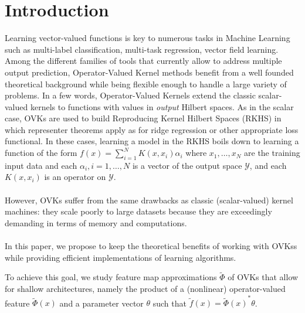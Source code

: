 \documentclass[twoside,11pt]{article}
\begin{document}

\section{Introduction}
Learning vector-valued functions is key to numerous tasks in Machine Learning such as multi-label classification, multi-task regression, vector field learning. 
Among the different families of tools that currently allow to address multiple output prediction, Operator-Valued Kernel methods \citep{Micchelli2005,Carmeli2010,Kadri_aistat10,
Brouard2011,Alvarez2012} benefit from a well founded theoretical background while being flexible enough to handle a large variety of problems. In a few words, Operator-Valued Kernels extend the classic scalar-valued kernels to functions
with values in \emph{output} Hilbert spaces. As in the scalar case,
\acfp{OVK} are used to build Reproducing Kernel Hilbert Spaces (\acs{RKHS}) in
which representer theorems apply as for ridge regression or other appropriate
loss functional. In these cases, learning a model in the \acs{RKHS} boils down
to learning a function of the form $f(x)=\sum_{i=1}^N K(x,x_i)\alpha_i$ where
$x_1, \ldots, x_N$ are the training input data and each $\alpha_i, i=1, \ldots,
N$ is a vector of the output space $\mathcal{Y}$, and each $K(x,x_i)$ is an
operator on $\mathcal{Y}$.
\paragraph{}
However, \acsp{OVK} suffer from the same drawbacks as classic
(sca\-lar-va\-lued) kernel machines: they scale poorly to large datasets
because they are exceedingly demanding in terms of memory and computations. 




\paragraph{}
In this paper, we propose to keep the theoretical benefits of working with \acsp{OVK}s while providing efficient implementations of learning algorithms.

To achieve this goal, 
we study feature map approximations $\widetilde{\Phi}$ of  \acsp{OVK} that allow for shallow architectures,
namely the product of a (nonlinear) operator-valued feature
$\widetilde{\Phi}(x)$ and a parameter vector $\theta$ such that
$\widetilde{f}(x) = {\widetilde{\Phi}(x)}^* \theta$. 
\end{document}
